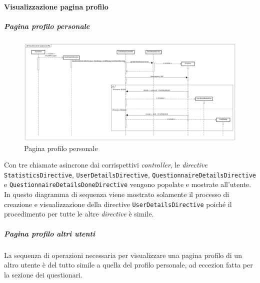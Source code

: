 \paragraph{Visualizzazione pagina profilo}

\subparagraph{Pagina profilo personale}

\label{Pagina profilo personale}

\begin{figure}[ht]
	\centering
	\includegraphics[scale=0.25,keepaspectratio]{UML/DiagrammiDiSequenza/Front-end/UserPage.png}
	\caption{Pagina profilo personale}
\end{figure} \FloatBarrier

Con tre chiamate asincrone dai corrispettivi \textit{controller}, le \textit{directive} \texttt{StatisticsDirective}, \texttt{UserDetailsDirective}, \texttt{QuestionnaireDetailsDirective} e \texttt{QuestionnaireDetailsDoneDirective} vengono popolate e mostrate all'utente. 
In questo diagramma di sequenza viene mostrato solamente il processo di creazione e visualizzazione della directive \texttt{UserDetailsDirective} poiché il procedimento per tutte le altre \textit{directive} è simile.

\subparagraph{Pagina profilo altri utenti}

La sequenza di operazioni necessaria per visualizzare una pagina profilo di un altro utente è del tutto simile a quella del profilo personale, ad eccezion fatta per la sezione dei questionari. 
